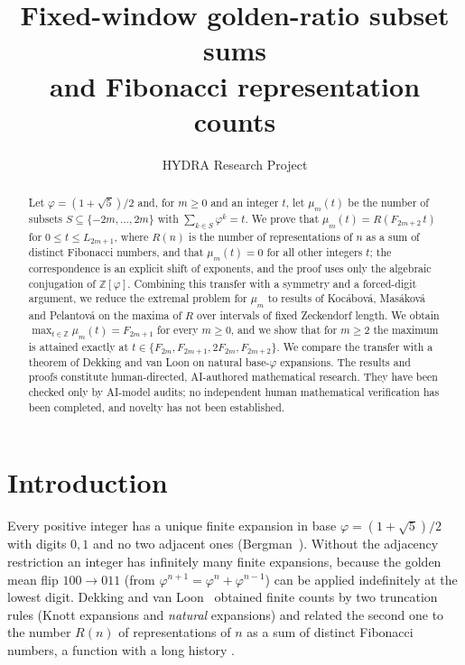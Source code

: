\documentclass[11pt]{amsart}
\title[Fixed-window golden-ratio subset sums]{Fixed-window golden-ratio subset sums\\ and Fibonacci representation counts}
\author{HYDRA Research Project}
\theoremstyle{definition}
\theoremstyle{remark}
\numberwithin{equation}{section}
\begin{document}
\begin{abstract}
Let $\varphi=(1+\sqrt5)/2$ and, for $m\ge 0$ and an integer $t$, let $\mu_m(t)$ be the number of
subsets $S\subseteq\{-2m,\dots,2m\}$ with $\sum_{k\in S}\varphi^k=t$. We prove that
$\mu_m(t)=R(F_{2m+2}\,t)$ for $0\le t\le L_{2m+1}$, where $R(n)$ is the number of representations of
$n$ as a sum of distinct Fibonacci numbers, and that $\mu_m(t)=0$ for all other integers $t$; the
correspondence is an explicit shift of exponents, and the proof uses only the algebraic conjugation
of $\mathbb{Z}[\varphi]$. Combining this transfer with a symmetry and a forced-digit argument, we
reduce the extremal problem for $\mu_m$ to results of Koc\'abov\'a, Mas\'akov\'a and Pelantov\'a on
the maxima of $R$ over intervals of fixed Zeckendorf length. We obtain
$\max_{t\in\mathbb{Z}}\mu_m(t)=F_{2m+1}$ for every $m\ge 0$, and we show that for $m\ge 2$ the
maximum is attained exactly at $t\in\{F_{2m},F_{2m+1},2F_{2m},F_{2m+2}\}$. We compare the transfer
with a theorem of Dekking and van Loon on natural base-$\varphi$ expansions.
The results and proofs constitute human-directed, AI-authored mathematical research. They have been checked only by AI-model audits; no independent human mathematical verification has been completed, and novelty has not been established.
\end{abstract}

\maketitle

\section{Introduction}\label{sec:intro}

Every positive integer has a unique finite expansion in base $\varphi=(1+\sqrt5)/2$ with digits
$0,1$ and no two adjacent ones (Bergman~\cite{Bergman1957}). Without the adjacency restriction an
integer has infinitely many finite expansions, because the golden mean flip $100\to 011$ (from
$\varphi^{n+1}=\varphi^n+\varphi^{n-1}$) can be applied indefinitely at the lowest digit.
Dekking and van Loon~\cite{DekkingVanLoon2024} obtained finite counts by two truncation rules
(Knott expansions and \emph{natural} expansions) and related the second one to the number $R(n)$
of representations of $n$ as a sum of distinct Fibonacci numbers, a function with a long history
\cite{Klarner1966,Robbins1996,BicknellFielder1999,Berstel2001,KMP2005,Stockmeyer2009,ChowSlattery2021}.
\end{document}

